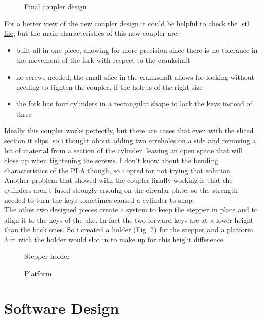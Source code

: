 \documentclass[a4paper,12pt]{article}
\begin{document}
\begin{multicols}{2}
\begin{figure}[H]
    \centering
    \caption{Final coupler design}
    \label{fig:grabnew}
\end{figure}
For a better view of the new coupler design it could be helpful to check the \href{https://github.com/Prop4et/LoM_Uketuner/blob/master/3D/grabnew.stl}{.stl file}, but the main characteristics of this new coupler are:
\begin{itemize}
    \item built all in one piece, allowing for more precision since there is no tolerance in the movement of the fork with respect to the crankshaft 
    \item no screws needed, the small slice in the crankshaft allows for locking without needing to tighten the coupler, if the hole is of the right size
    \item the fork has four cylinders in a rectangular shape to lock the keys instead of three
\end{itemize}
Ideally this coupler works perfectly, but there are cases that even with the sliced section it slips, so i thought about adding two screholes on a side and removing a bit of material from a section of the cylinder, leaving an open space that will close up when tightening the screws. I don't know about the bending characteristics of the PLA though, so i opted for not trying that solution.\\
Another problem that showed with the coupler finally working is that che cylinders aren't fused strongly enouhg on the circular plate, so the strength needed to turn the keys sometimes caused a cylinder to snap.\\
The other two designed pieces create a system to keep the stepper in place and to align it to the keys of the uke. In fact the two forward keys are at a lower height than the back ones. So i created a holder (Fig. \ref{fig:holder}) for the stepper and a platform \ref{fig:platform} in wich the holder would slot in to make up for this height difference.
\begin{figure}[H]
    \centering
    \caption{Stepper holder}
    \label{fig:holder}
\end{figure}\begin{figure}[H]
    \centering
    \caption{Platform}
    \label{fig:platform}
\end{figure}

\section{Software Design}

\end{multicols}
\newpage
\end{document}
